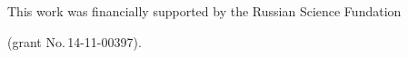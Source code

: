 \Ack





\vspace*{-6pt}





\noindent


This work was financially supported by the Russian Science Fundation


(grant No.\,14-11-00397).








\renewcommand{\bibname}{\protect\rmfamily References}







\vspace*{-9pt}





